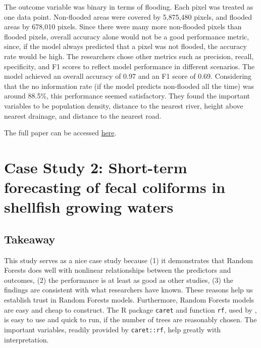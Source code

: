 \documentclass[
]{book}
\begin{document}
The outcome variable was binary in terms of flooding. Each pixel was treated as one data point. Non-flooded areas were covered by 5,875,480 pixels, and flooded areas by 678,010 pixels. Since there were many more non-flooded pixels than flooded pixels, overall accuracy alone would not be a good performance metric, since, if the model always predicted that a pixel was not flooded, the accuracy rate would be high. The researchers chose other metrics such as precision, recall, specificity, and F1 scores to reflect model performance in different scenarios. The model achieved an overall accuracy of 0.97 and an F1 score of 0.69. Considering that the no information rate (if the model predicts non-flooded all the time) was around 88.5\%, this performance seemed satisfactory. They found the important variables to be population density, distance to the nearest river, height above nearest drainage, and distance to the nearest road.

The full paper can be accessed \href{https://www.sciencedirect.com/science/article/pii/S1364815223001445?dgcid=author}{here}.

\hypertarget{case-study-2-short-term-forecasting-of-fecal-coliforms-in-shellfish-growing-waters}{%
\section{Case Study 2: Short-term forecasting of fecal coliforms in shellfish growing waters}\label{case-study-2-short-term-forecasting-of-fecal-coliforms-in-shellfish-growing-waters}}

\hypertarget{takeaway-1}{%
\subsection{Takeaway}\label{takeaway-1}}

This study serves as a nice case study because (1) it demonstrates that Random Forests does well with nonlinear relationships between the predictors and outcomes, (2) the performance is at least as good as other studies, (3) the findings are consistent with what researchers have known. These reasons help us establish trust in Random Forests models. Furthermore, Random Forests models are easy and cheap to construct. The R package \texttt{caret} and function \texttt{rf}, used by \citet{chazal2024}, is easy to use and quick to run, if the number of trees are reasonably chosen. The important variables, readily provided by \texttt{caret::rf}, help greatly with interpretation.
\end{document}
